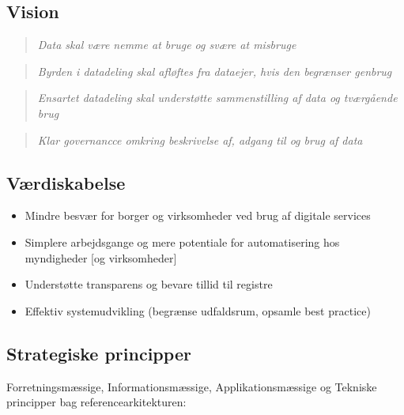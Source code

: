 \subsection{Vision}\label{vision}

\begin{quote}
\emph{Data skal være nemme at bruge og svære at misbruge}
\end{quote}

\begin{quote}
\emph{Byrden i datadeling skal afløftes fra dataejer, hvis den begrænser
genbrug}
\end{quote}

\begin{quote}
\emph{Ensartet datadeling skal understøtte sammenstilling af data og
tværgående brug}
\end{quote}

\begin{quote}
\emph{Klar governancce omkring beskrivelse af, adgang til og brug af
data}
\end{quote}

\subsection{Værdiskabelse}\label{vuxe6rdiskabelse}

\begin{itemize}
\tightlist
\item
  Mindre besvær for borger og virksomheder ved brug af digitale services
\item
  Simplere arbejdsgange og mere potentiale for automatisering hos
  myndigheder {[}og virksomheder{]}
\item
  Understøtte transparens og bevare tillid til registre
\item
  Effektiv systemudvikling (begrænse udfaldsrum, opsamle best practice)
\end{itemize}

\subsection{Strategiske principper}\label{strategiske-principper}

Forretningsmæssige, Informationsmæssige, Applikationsmæssige og Tekniske
principper bag referencearkitekturen:

